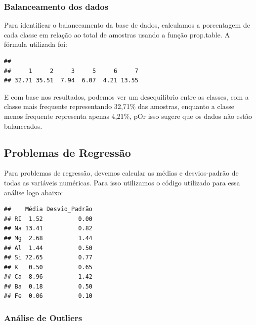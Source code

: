 \documentclass[
]{article}
\newenvironment{Shaded}{\begin{snugshade}}{\end{snugshade}}
\newcommand{\DecValTok}[1]{\textcolor[rgb]{0.00,0.00,0.81}{#1}}
\newcommand{\FunctionTok}[1]{\textcolor[rgb]{0.13,0.29,0.53}{\textbf{#1}}}
\newcommand{\NormalTok}[1]{#1}
\newcommand{\SpecialCharTok}[1]{\textcolor[rgb]{0.81,0.36,0.00}{\textbf{#1}}}
\begin{document}
\subsubsection{Balanceamento dos dados}\label{balanceamento-dos-dados}

Para identificar o balanceamento da base de dados, calculamos a
porcentagem de cada classe em relação ao total de amostras usando a
função prop.table. A fórmula utilizada foi:

\begin{Shaded}
\end{Shaded}

\begin{verbatim}
## 
##     1     2     3     5     6     7 
## 32.71 35.51  7.94  6.07  4.21 13.55
\end{verbatim}

E com base nos resultados, podemos ver um desequilíbrio entre as
classes, com a classe mais frequente representando 32,71\% das amostras,
enquanto a classe menos frequente representa apenas 4,21\%, pOr isso
sugere que os dados não estão balanceados.

\subsection{\texorpdfstring{Problemas de Regressão
}{Problemas de Regressão }}\label{problemas-de-regressuxe3o}

Para problemas de regressão, devemos calcular as médias e desvios-padrão
de todas as variáveis numéricas. Para isso utilizamos o código utilizado
para essa análise logo abaixo:

\begin{verbatim}
##    Média Desvio_Padrão
## RI  1.52          0.00
## Na 13.41          0.82
## Mg  2.68          1.44
## Al  1.44          0.50
## Si 72.65          0.77
## K   0.50          0.65
## Ca  8.96          1.42
## Ba  0.18          0.50
## Fe  0.06          0.10
\end{verbatim}

\subsubsection{Análise de Outliers}\label{anuxe1lise-de-outliers}
\end{document}
